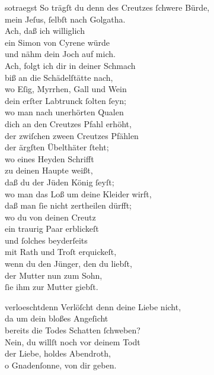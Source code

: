 \documentclass[abbrwidth=6em,tocstyle=ref-genre,shorttitlesize=50]{ees}
\begin{document}
{\begin{movement}{sotraegst}
  \voice[Alto]
  So trägſt du denn des Creutzes ſchwere Bürde,\\
  mein Jeſus, ſelbſt nach Golgatha.\\
  Ach, daß ich williglich\\
  ein Simon von Cyrene würde\\
  und nähm dein Joch auf mich.\\
  Ach, folgt ich dir in deiner Schmach\\
  biß an die Schädelſtätte nach,\\
  wo Eſig, Myrrhen, Gall und Wein\\
  dein erſter Labtrunck ſolten ſeyn;\\
  wo man nach unerhörten Qualen\\
  dich an den Creutzes Pfahl erhöht,\\
  der zwiſchen zween Creutzes Pfählen\\
  der ärgſten Übelthäter ſteht;\\
  wo eines Heyden Schrifft\\
  zu deinen Haupte weißt,\\
  daß du der Jüden König ſeyſt;\\
  wo man das Loß um deine Kleider wirft,\\
  daß man ſie nicht zertheilen dürfft;\\
  wo du von deinen Creutz\\
  ein traurig Paar erblickeſt\\
  und ſolches beyderſeits\\
  mit Rath und Troſt erquickeſt,\\
  wenn du den Jünger, den du liebſt,\\
  der Mutter nun zum Sohn,\\
  ſie ihm zur Mutter giebſt.
\end{movement}

\begin{movement}{verloeschtdenn}
  \voice[Alto]
  Verlöſcht denn deine Liebe nicht,\\
  da um dein bloßes Angeſicht\\
  bereits die Todes Schatten ſchweben?\\
  Nein, du willſt noch vor deinem Todt\\
  der Liebe, holdes Abendroth,\\
  o Gnadenſonne, von dir geben.
\end{movement}

}
\end{document}
